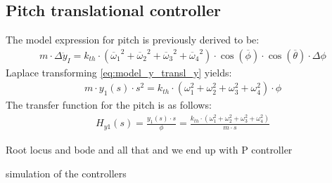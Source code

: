 \subsection*{Pitch translational controller}
The model expression for pitch is previously derived to be:
\begin{align}
m\cdot\Delta\ddot{y}_I = k_{th}\cdot({\overline{\omega}_1}^2+{\overline{\omega}_2}^2+{\overline{\omega}_3}^2+{\overline{\omega}_4}^2)\cdot\cos(\overline{\phi})\cdot\cos(\overline{\theta})\cdot\Delta\phi
\label{eq:model_y_transl}
\end{align}
Laplace transforming \autoref{eq:model_y_transl_y} yields:
\begin{align}
m\cdot y_1(s)\cdot s^2= k_{th}\cdot (\omega_1 ^2 + \omega_2 ^2 + \omega_3 ^2 + \omega_4 ^2)\cdot \phi
\end{align}
The transfer function for the pitch is as follows:
\begin{align}
H_{y1}(s)=\frac{y_1(s)\cdot s}{\phi}=\frac{k_{th}\cdot (\omega_1 ^2 + \omega_2 ^2 + \omega_3 ^2 + \omega_4 ^2)}{m\cdot s}
\end{align}
\begin{where}
\end{where}
 
Root locus and bode and all that and we end up with P controller

simulation of the controllers